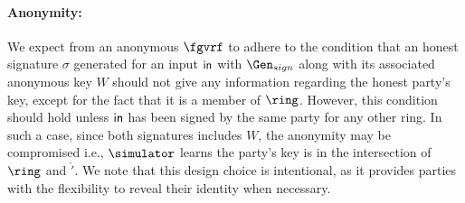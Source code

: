 	
	
	
	
	
	\paragraph{Anonymity:} We expect from an anonymous $ \fgvrf $  to adhere to the condition that an honest signature $\sigma$ generated for an input $\mathsf{in}$ with $ \Gen_{sign} $ along with its associated anonymous key $W$ should not give any information regarding the honest party's key, except for the fact that it is a member of $ \ring $.  However, this condition should hold unless $\mathsf{in}$ has been signed by the same party for any other  ring. In such a case,  since both signatures includes $ W $, the anonymity may be compromised  i.e.,  $ \simulator $  learns the party's key is in the intersection of $ \ring $ and $ \ring' $. We note that this design choice is intentional, as it provides parties with the flexibility to reveal their identity when necessary.
		
